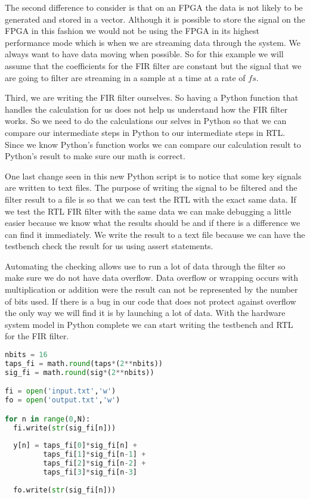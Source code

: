 The second difference to consider is that on an \ac{FPGA} the data is not likely to be generated and stored in a vector. Although it is possible to store the signal on the \ac{FPGA} in this fashion we would not be using the \ac{FPGA} in its highest performance mode which is when we are streaming data through the system. We always want to have data moving when possible. So for this example we will assume that the coefficients for the \ac{FIR} filter are constant but the signal that we are going to filter are streaming in a sample at a time at a rate of $fs$.

Third, we are writing the \ac{FIR} filter ourselves. So having a Python function that handles the calculation for us does not help us understand how the \ac{FIR} filter works. So we need to do the calculations our selves in Python so that we can compare our intermediate steps in Python to our intermediate steps in \ac{RTL}. Since we know Python's function works we can compare our calculation result to Python's result to make sure our math is correct.

One last change seen in this new Python script is to notice that some key signals are written to text files. The purpose of writing the signal to be filtered and the filter result to a file is so that we can test the \ac{RTL} with the exact same data. If we test the \ac{RTL} \ac{FIR} filter with the same data we can make debugging a little easier because we know what the results should be and if there is a difference we can find it immediately. We write the result to a text file because we can have the testbench check the result for us using assert statements. 

Automating the checking allows use to run a lot of data through the filter so make sure we do not have data overflow. Data overflow or wrapping occurs with multiplication or addition were the result can not be represented by the number of bits used. If there is a bug in our code that does not protect against overflow the only way we will find it is by launching a lot of data.  With the hardware system model in Python complete we can start writing the testbench and \ac{RTL} for the \ac{FIR} filter.

\begin{lstlisting}[language=Python]
nbits = 16
taps_fi = math.round(taps*(2**nbits))
sig_fi = math.round(sig*(2**nbits))

fi = open('input.txt','w')
fo = open('output.txt','w')

for n in range(0,N):
  fi.write(str(sig_fi[n]))
	
  y[n] = taps_fi[0]*sig_fi[n] + 
         taps_fi[1]*sig_fi[n-1] + 
         taps_fi[2]*sig_fi[n-2] + 
         taps_fi[3]*sig_fi[n-3] 
	
  fo.write(str(sig_fi[n]))
\end{lstlisting}

